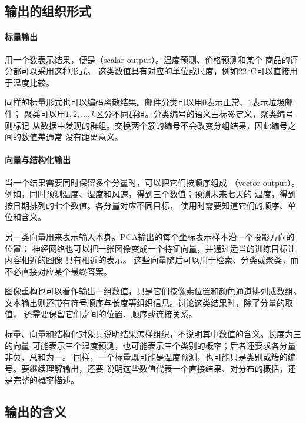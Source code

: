 \subsection{输出的组织形式}
\label{sec:models-output-form}

\paragraph{标量输出}
\label{sec:models-scalar-output}

用一个数表示结果，便是（scalar output）。温度预测、价格预测和某个
商品的评分都可以采用这种形式。
这类数值具有对应的单位或尺度，例如$22\,^{\circ}\mathrm{C}$可以直接用于温度比较。

同样的标量形式也可以编码离散结果。邮件分类可以用$0$表示正常、$1$表示垃圾邮件；
聚类可以用$1,2,\ldots,k$区分不同群组。分类编号的语义由标签定义，聚类编号则标记
从数据中发现的群组。交换两个簇的编号不会改变分组结果，因此编号之间的数值差通常
没有距离意义。

\paragraph{向量与结构化输出}
\label{sec:models-vector-output}

当一个结果需要同时保留多个分量时，可以把它们按顺序组成
（vector output）。例如，同时预测温度、湿度和风速，得到三个数值；预测未来七天的
温度，得到按日期排列的七个数值。各分量对应不同目标，
使用时需要知道它们的顺序、单位和含义。

另一类向量用来表示输入本身。PCA输出的每个坐标表示样本沿一个投影方向的位置；
神经网络也可以把一张图像变成一个特征向量，并通过适当的训练目标让内容相近的图像
具有相近的表示。
这些向量随后可以用于检索、分类或聚类，而不必直接对应某个最终答案。

图像重构也可以看作输出一组数值，只是它们按像素位置和颜色通道排列成数组。
文本输出则还带有符号顺序与长度等组织信息。讨论这类结果时，除了分量的取值，
还需要保留它们之间的位置、顺序或连接关系。

标量、向量和结构化对象只说明结果怎样组织，不说明其中数值的含义。长度为三的向量
可能表示三个温度预测，也可能表示三个类别的概率；后者还要求各分量非负、总和为一。
同样，一个标量既可能是温度预测，也可能只是类别或簇的编号。要继续理解输出，还要
说明这些数值代表一个直接结果、对分布的概括，还是完整的概率描述。

\subsection{输出的含义}
\label{sec:models-output-semantics}

